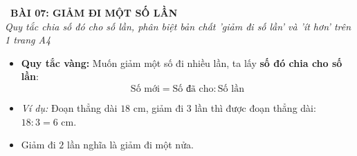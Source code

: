 \documentclass[12pt,a4paper]{article}
\begin{document}
\begin{tcolorbox}[
  enhanced,
  colback=teal!8!white,
  colframe=teal!70!black,
  arc=3mm, boxrule=1.2pt,
  left=3mm, right=3mm, top=2mm, bottom=2mm,
  halign=center
]
  {\LARGE\bfseries\color{teal!90!black}\faBookmark\ BÀI 07: GIẢM ĐI MỘT SỐ LẦN}\\[1mm]
  {\itshape\footnotesize\color{black!75} Quy tắc chia số đó cho số lần, phân biệt bản chất 'giảm đi số lần' và 'ít hơn' trên 1 trang A4}
\end{tcolorbox}

\vspace{-2mm}

\noindent
\begin{minipage}[t]{0.49\textwidth}\vspace{0pt}
\begin{tcolorbox}[
  enhanced,
  colback=blue!4!white,
  colframe=blue!75!black,
  arc=2mm, boxrule=0.8pt,
  left=2mm, right=2mm, top=1.8mm, bottom=1.8mm,
  title={\footnotesize\bfseries\color{white}\faCut\ 1. Quy tắc Giảm đi một số lần}
]
{\footnotesize
\begin{itemize}\setlength{\itemsep}{1pt}\setlength{\leftskip}{-2.5mm}
  \item \textbf{Quy tắc vàng:} Muốn giảm một số đi nhiều lần, ta lấy \textbf{số đó chia cho số lần}:
  $$\text{Số mới} = \text{Số đã cho} : \text{Số lần}$$
  \item \textit{Ví dụ:} Đoạn thẳng dài $18\text{ cm}$, giảm đi $3$ lần thì được đoạn thẳng dài: $18 : 3 = 6\text{ cm}$.
  \item Giảm đi $2$ lần nghĩa là giảm đi một nửa.
\end{itemize}
}
\end{tcolorbox}
\end{minipage}
\hfill
\end{document}
